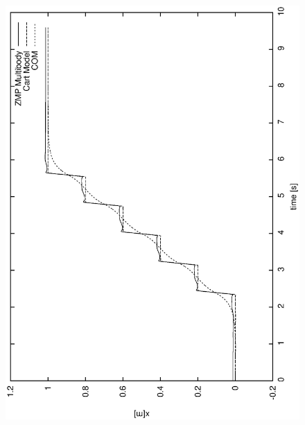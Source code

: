 \begin{figure}[htb]
\begin{center}
\includegraphics[width=\linewidth]{./figures/PatternGenerator/SecondFigureZMPMB_X}

\end{center}
\end{figure}
